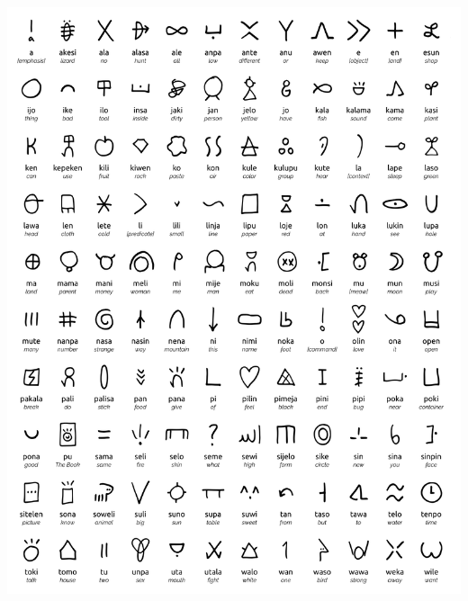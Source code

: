 \documentclass[10pt,a4paper]{article}
\begin{document}
\begin{center}
\includegraphics[width=0.95\linewidth]{tokipona.png}


\end{center}
\end{document}
